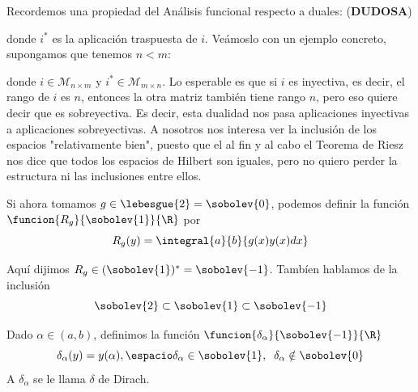 \begin{remark}
Recordemos una propiedad del Análisis funcional respecto a duales: (\textbf{DUDOSA})
\begin{center}
\end{center}
donde $i^*$ es la aplicación traspuesta de $i$. Veámoslo con un ejemplo concreto, supongamos que tenemos $n<m$:
\begin{center}
\end{center}
donde $i\in\mathcal{M}_{n\times m}$ y $i^*\in\mathcal{M}_{m\times n}$. Lo esperable es que si $i$ es inyectiva, es decir, el rango de $i$ es $n$, entonces la otra matriz también tiene rango $n$, pero eso quiere decir que es sobreyectiva. Es decir, esta dualidad nos pasa aplicaciones inyectivas a aplicaciones sobreyectivas. A nosotros nos interesa ver la inclusión de los espacios "relativamente bien", puesto que el al fin y al cabo el Teorema de Riesz nos dice que todos los espacios de Hilbert son iguales, pero no quiero perder la estructura ni las inclusiones entre ellos.
\end{remark}


Si ahora tomamos $g\in\lebesgue{2}=\sobolev{0}$, podemos definir la función $\funcion{R_g}{\sobolev{1}}{\R}$ por
\[
R_g(y)=\integral{a}{b}{g(x)y(x)dx} 
\]

Aquí dijimos $R_g\in(\sobolev{1})^*=\sobolev{-1}$. Tambíen hablamos de la inclusión
\[
\sobolev{2}\subset\sobolev{1}\subset\sobolev{-1}
\]

\begin{definition}
Dado $\alpha\in(a,b)$, definimos la función $\funcion{\delta_\alpha}{\sobolev{-1}}{\R}$
\[
\delta_\alpha(y)=y(\alpha), \espacio \delta_\alpha\in\sobolev{1}, \;\; \delta_\alpha\notin\sobolev{0}
\]
A $\delta_\alpha$ se le llama $\delta$ de Dirach.
\end{definition}

